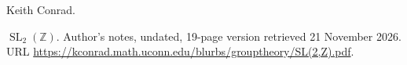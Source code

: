 Keith Conrad.

\newblock $\operatorname{SL}_2(\mathbb Z)$.
\newblock Author's notes, undated, 19-page version retrieved
  21 November 2026.
\newblock URL
  \url{https://kconrad.math.uconn.edu/blurbs/grouptheory/SL(2,Z).pdf}.

